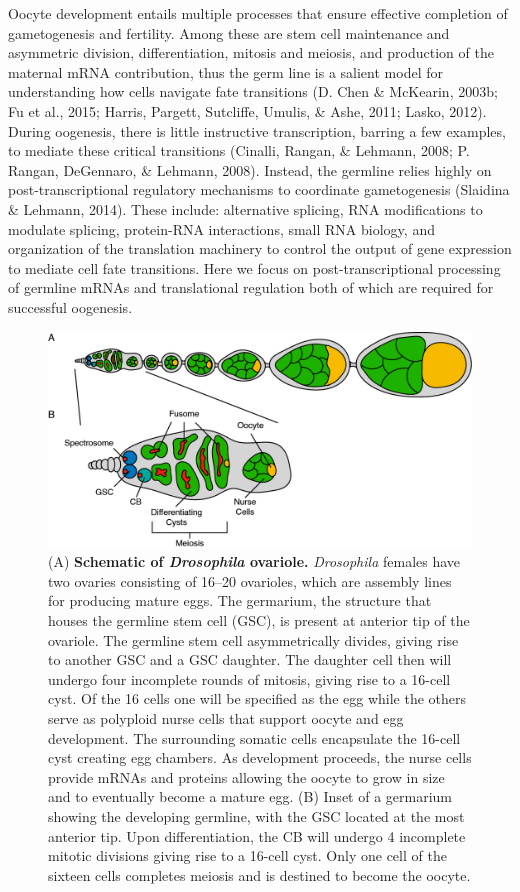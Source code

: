 \documentclass[12pt,oneside]{reedthesis}
\begin{document}
Oocyte development entails multiple processes that ensure effective
completion of gametogenesis and fertility. Among these are stem cell
maintenance and asymmetric division, differentiation, mitosis and
meiosis, and production of the maternal mRNA contribution, thus the germ
line is a salient model for understanding how cells navigate fate
transitions (D. Chen \& McKearin, 2003b; Fu et al., 2015; Harris, Pargett, Sutcliffe, Umulis, \& Ashe, 2011; Lasko, 2012).
During oogenesis, there is little instructive transcription, barring a
few examples, to mediate these critical transitions (Cinalli, Rangan, \& Lehmann, 2008; P. Rangan, DeGennaro, \& Lehmann, 2008). Instead, the germline relies highly on
post-transcriptional regulatory mechanisms to coordinate gametogenesis
(Slaidina \& Lehmann, 2014). These include: alternative splicing, RNA
modifications to modulate splicing, protein-RNA interactions, small RNA
biology, and organization of the translation machinery to control the
output of gene expression to mediate cell fate transitions. Here we
focus on post-transcriptional processing of germline mRNAs and
translational regulation both of which are required for successful
oogenesis.
\begin{figure}

{\centering \includegraphics[width=0.97\linewidth]{./figure/Book Chapter/Figure1} 

}

\caption[\textbf{Schematic of \emph{Drosophila} ovariole.}]{(A) \textbf{Schematic of \emph{Drosophila} ovariole.} \emph{Drosophila} females have two ovaries consisting of 16--20 ovarioles, which are assembly lines for producing mature eggs. The germarium, the structure that houses the germline stem cell (GSC), is present at anterior tip of the ovariole. The germline stem cell asymmetrically divides, giving rise to another GSC and a GSC daughter. The daughter cell then will undergo four incomplete rounds of mitosis, giving rise to a 16-cell cyst. Of the 16 cells one will be specified as the egg while the others serve as polyploid nurse cells that support oocyte and egg development. The surrounding somatic cells encapsulate the 16-cell cyst creating egg chambers. As development proceeds, the nurse cells provide mRNAs and proteins allowing the oocyte to grow in size and to eventually become a mature egg. (B) Inset of a germarium showing the developing germline, with the GSC located at the most anterior tip. Upon differentiation, the CB will undergo 4 incomplete mitotic divisions giving rise to a 16-cell cyst. Only one cell of the sixteen cells completes meiosis and is destined to become the oocyte.}\label{fig:unnamed-chunk-4}
\end{figure}
\end{document}
